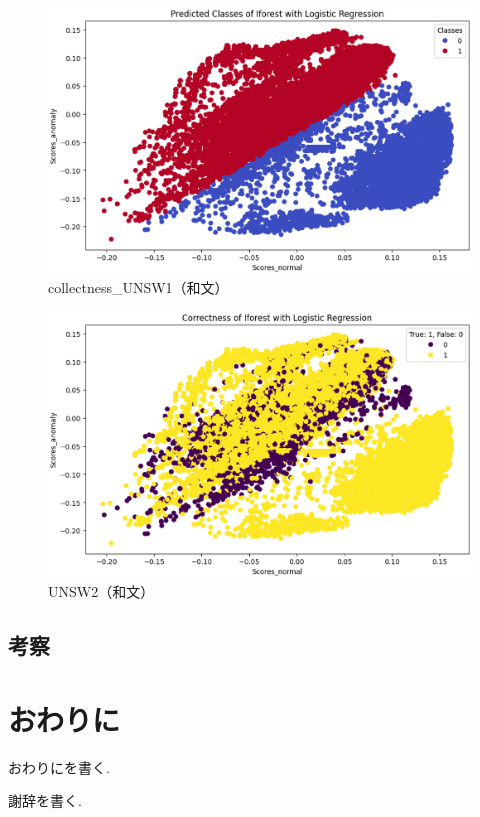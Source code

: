 \documentclass{css}
\begin{document}
\begin{figure}[tb]
    \centering
    \includegraphics[width=\linewidth]{pictures/eps/UNSW1.eps}
    \caption{collectness\_UNSW1（和文）}
    \label{fig:collectness_UNSW}
\end{figure}

\begin{figure}[tb]
    \centering
    \includegraphics[width=\linewidth]{pictures/eps/UNSW2.eps}
    \caption{UNSW2（和文）}
    \label{fig:collectness_UNSW}
\end{figure}





\subsection{考察}


\section{おわりに}
おわりにを書く.

\begin{acknowledgment}
謝辞を書く.
\end{acknowledgment}

\begin{thebibliography}{10}

\end{thebibliography}
\end{document}
